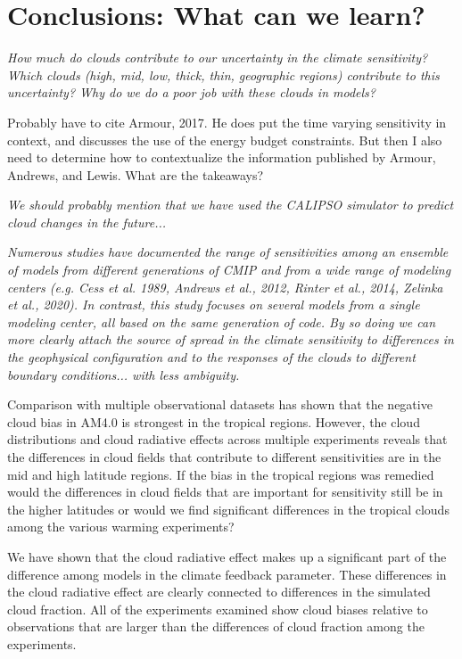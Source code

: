 \documentclass[draft]{agujournal2019}
\begin{document}
\section{Conclusions: What can we learn?}

\textit{How much do clouds contribute to our uncertainty in the climate sensitivity?  
Which clouds (high, mid, low, thick, thin, geographic regions) contribute to this uncertainty?
Why do we do a poor job with these clouds in models? }

Probably have to cite Armour, 2017.  He does put the time varying sensitivity in context, and discusses the use of the energy budget constraints.  But then I also need to determine how to contextualize the information published by Armour, Andrews, and Lewis.  What are the takeaways?  

\textit{We should probably mention that we have used the CALIPSO simulator to predict cloud changes in the future...}

\textit{Numerous studies have documented the range of sensitivities among an ensemble of models from different
generations of CMIP and from a wide range of modeling centers (e.g. Cess et al. 1989, Andrews et al., 2012, Rinter et al., 2014, Zelinka et al., 2020).  In contrast, this study focuses on several models from a single modeling center, all based on the same generation of code.  By so doing we can more clearly attach the source of spread in the climate sensitivity to differences in the geophysical configuration and to the responses of the clouds to different boundary conditions... with less ambiguity.}

Comparison with multiple observational datasets has shown that the negative cloud bias
in AM4.0 is strongest in the tropical regions.  However, the cloud distributions and 
cloud radiative effects across multiple experiments reveals that the differences in cloud fields that 
contribute to different sensitivities are in the mid and high latitude regions.  If the bias in 
the tropical regions was remedied would the differences in cloud fields that are important for sensitivity
still be in the higher latitudes or would we find significant differences in the tropical clouds among 
the various warming experiments?     

We have shown that the cloud radiative effect makes up a significant part of the difference 
among models in the climate feedback parameter.  These differences in the cloud radiative
effect are clearly connected to differences in the simulated cloud fraction.  
All of the experiments examined show cloud biases relative to observations that are larger than the differences of cloud fraction among the experiments.      
\end{document}
